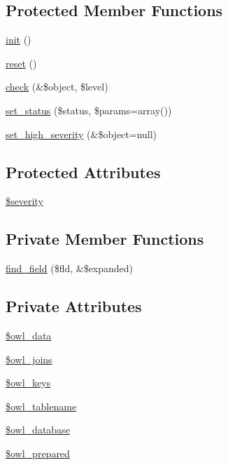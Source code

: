 \subsection*{Protected Member Functions}
\begin{DoxyCompactItemize}
\item 
\hyperlink{class__OWL_ae0ef3ded56e8a6b34b6461e5a721cd3e}{init} ()
\item 
\hyperlink{class__OWL_a2f2a042bcf31965194c03033df0edc9b}{reset} ()
\item 
\hyperlink{class__OWL_ad6f4f6946f40199dd0333cf219fa500e}{check} (\&\$object, \$level)
\item 
\hyperlink{class__OWL_aea912d0ede9b3c2a69b79072d94d4787}{set\_\-status} (\$status, \$params=array())
\item 
\hyperlink{class__OWL_a576829692a3b66e3d518853bf43abae3}{set\_\-high\_\-severity} (\&\$object=null)
\end{DoxyCompactItemize}
\subsection*{Protected Attributes}
\begin{DoxyCompactItemize}
\item 
\hyperlink{class__OWL_ad26b40a9dbbacb33e299b17826f8327c}{\$severity}
\end{DoxyCompactItemize}
\subsection*{Private Member Functions}
\begin{DoxyCompactItemize}
\item 
\hyperlink{classDataHandler_a1e4789e22370c96ae479bc3a58f30984}{find\_\-field} (\$fld, \&\$expanded)
\end{DoxyCompactItemize}
\subsection*{Private Attributes}
\begin{DoxyCompactItemize}
\item 
\hyperlink{classDataHandler_a329b5524c379e0db6c4d5ce59f3c414f}{\$owl\_\-data}
\item 
\hyperlink{classDataHandler_ada9b697f81ea82d269077f9c7445791d}{\$owl\_\-joins}
\item 
\hyperlink{classDataHandler_a8d398720bce975159b2d13ad7a941bc7}{\$owl\_\-keys}
\item 
\hyperlink{classDataHandler_a24620784bde262bdd02227962d3b9605}{\$owl\_\-tablename}
\item 
\hyperlink{classDataHandler_a3ac49aa018e0ebe4c74f5a636d455a8b}{\$owl\_\-database}
\item 
\hyperlink{classDataHandler_ae6093d21291ed3ab3183e11962452928}{\$owl\_\-prepared}
\end{DoxyCompactItemize}



